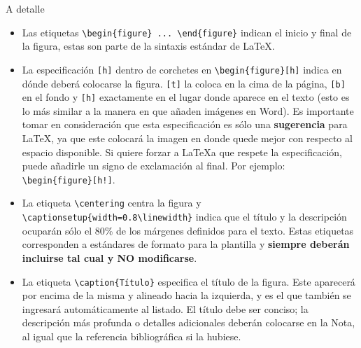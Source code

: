 \newpage
A detalle
\begin{itemize}
    \itemsep 0em

    \item Las etiquetas \verb|\begin{figure} ... \end{figure}| indican el inicio y final de la figura, estas son parte de la sintaxis estándar de \LaTeX.

    \item La especificación \verb|[h]| dentro de corchetes en \verb|\begin{figure}[h]| indica en dónde deberá colocarse la figura. \verb|[t]| la coloca en la cima de la página, \verb|[b]| en el fondo y \verb|[h]| exactamente en el lugar donde aparece en el texto (esto es lo más similar a la manera en que añaden imágenes en Word). Es importante tomar en consideración que esta especificación es sólo una \textbf{sugerencia} para \LaTeX, ya que este colocará la imagen en donde quede mejor con respecto al espacio disponible. Si quiere forzar a \LaTeX a que respete la especificación, puede añadirle un signo de exclamación al final. Por ejemplo: \verb|\begin{figure}[h!]|.

    \item La etiqueta \verb|\centering| centra la figura y \verb|\captionsetup{width=0.8\linewidth}| indica que el título y la descripción ocuparán sólo el 80\% de los márgenes definidos para el texto. Estas etiquetas corresponden a estándares de formato para la plantilla y \textbf{siempre deberán incluirse tal cual y NO modificarse}.

    \item La etiqueta \verb|\caption{Título}| especifica el título de la figura. Este aparecerá por encima de la misma y alineado hacia la izquierda, y es el que también se ingresará automáticamente al listado. El título debe ser conciso; la descripción más profunda o detalles adicionales deberán colocarse en la Nota, al igual que la referencia bibliográfica si la hubiese. 


\end{itemize}
